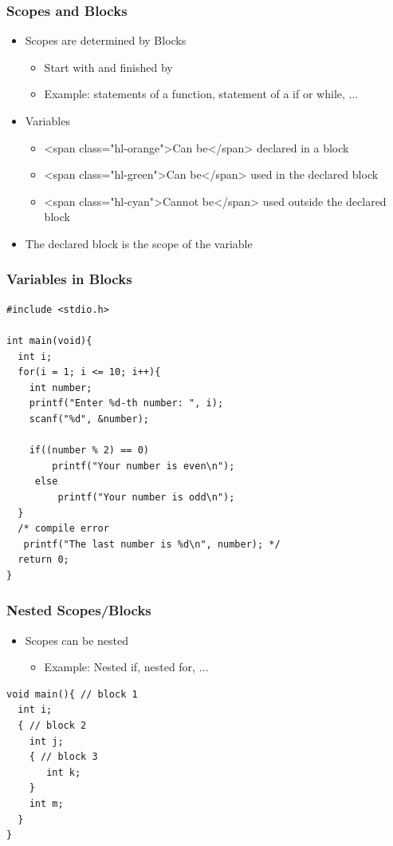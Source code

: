 \documentclass{../c-lecture}
\begin{document}
\begin{frame}
  \frametitle{Scopes and Blocks}
  \begin{itemize}
    \item Scopes are determined by Blocks
    \begin{itemize}
      \item Start with { and finished by }
      \item
        Example: statements of a function, statement of a if or while, ...

    \end{itemize}
    \item Variables
    \begin{itemize}
      \item <span class="hl-orange">Can be</span> declared in a block
      \item <span class="hl-green">Can be</span> used in the declared block
      \item
        <span class="hl-cyan">Cannot be</span> used outside the declared block

    \end{itemize}
    \item The declared block is the scope of the variable
  \end{itemize}
\end{frame}

\begin{frame}[fragile]
  \frametitle{Variables in Blocks}
  \begin{verbatim}
#include <stdio.h>

int main(void){
  int i;
  for(i = 1; i <= 10; i++){
    int number;
    printf("Enter %d-th number: ", i);
    scanf("%d", &number);

    if((number % 2) == 0)
        printf("Your number is even\n");
     else
         printf("Your number is odd\n");
  }
  /* compile error
   printf("The last number is %d\n", number); */
  return 0;
}
  \end{verbatim}
\end{frame}

\begin{frame}
  \frametitle{Nested Scopes/Blocks}
  \begin{itemize}
    \item Scopes can be nested
    \begin{itemize}
      \item Example: Nested if, nested for, ...
    \end{itemize}
  \end{itemize}
  \begin{verbatim}
void main(){ // block 1
  int i;
  { // block 2
    int j;
    { // block 3
       int k;
    }
    int m;
  }
}
  \end{verbatim}
\end{frame}
\end{document}
